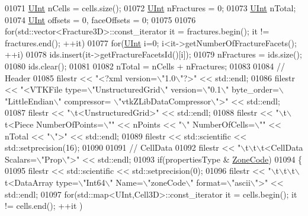 \begin{DoxyCode}
01071     \hyperlink{namespaceFVCode3D_a4bf7e328c75d0fd504050d040ebe9eda}{UInt} nCells = cells.size();
01072     \hyperlink{namespaceFVCode3D_a4bf7e328c75d0fd504050d040ebe9eda}{UInt} nFractures = 0;
01073     \hyperlink{namespaceFVCode3D_a4bf7e328c75d0fd504050d040ebe9eda}{UInt} nTotal;
01074     \hyperlink{namespaceFVCode3D_a4bf7e328c75d0fd504050d040ebe9eda}{UInt} offsets = 0, faceOffsets = 0;
01075 
01076     \textcolor{keywordflow}{for}(std::vector<Fracture3D>::const\_iterator it = fractures.begin(); it != fractures.end(); ++it)
01077         \textcolor{keywordflow}{for}(\hyperlink{namespaceFVCode3D_a4bf7e328c75d0fd504050d040ebe9eda}{UInt} i=0; i<it->getNumberOfFractureFacets(); ++i)
01078           ids.insert(it->getFractureFacetsId()[i]);
01079     nFractures = ids.size();
01080     ids.clear();
01081 
01082     nTotal = nCells + nFractures;
01083 
01084     \textcolor{comment}{// Header}
01085     filestr << \textcolor{stringliteral}{"<?xml version=\(\backslash\)"1.0\(\backslash\)"?>"} << std::endl;
01086     filestr << \textcolor{stringliteral}{"<VTKFile type=\(\backslash\)"UnstructuredGrid\(\backslash\)" version=\(\backslash\)"0.1\(\backslash\)" byte\_order=\(\backslash\)"LittleEndian\(\backslash\)" compressor=
      \(\backslash\)"vtkZLibDataCompressor\(\backslash\)">"} << std::endl;
01087     filestr << \textcolor{stringliteral}{"\(\backslash\)t<UnstructuredGrid>"} << std::endl;
01088     filestr << \textcolor{stringliteral}{"\(\backslash\)t\(\backslash\)t<Piece NumberOfPoints=\(\backslash\)""} << nPoints << \textcolor{stringliteral}{"\(\backslash\)" NumberOfCells=\(\backslash\)""} << nTotal << \textcolor{stringliteral}{"\(\backslash\)">"} << 
      std::endl;
01089     filestr << std::scientific << std::setprecision(16);
01090 
01091     \textcolor{comment}{// CellData}
01092     filestr << \textcolor{stringliteral}{"\(\backslash\)t\(\backslash\)t\(\backslash\)t<CellData Scalars=\(\backslash\)"Prop\(\backslash\)">"} << std::endl;
01093     \textcolor{keywordflow}{if}(propertiesType & \hyperlink{namespaceFVCode3D_ab3abc77722284ce4344be90bb61c1a41a98a639655750204022119fd2d64ecdf0}{ZoneCode})
01094     \{
01095         filestr << std::scientific << std::setprecision(0);
01096         filestr << \textcolor{stringliteral}{"\(\backslash\)t\(\backslash\)t\(\backslash\)t\(\backslash\)t<DataArray type=\(\backslash\)"Int64\(\backslash\)" Name=\(\backslash\)"zoneCode\(\backslash\)" format=\(\backslash\)"ascii\(\backslash\)">"} << std::endl;
01097         \textcolor{keywordflow}{for}(std::map<UInt,Cell3D>::const\_iterator it = cells.begin(); it != cells.end(); ++it )

\end{DoxyCode}
